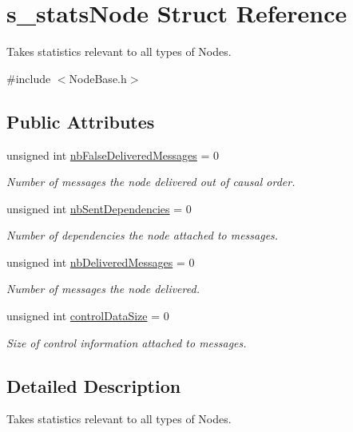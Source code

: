 \hypertarget{structs__stats_node}{}\section{s\+\_\+stats\+Node Struct Reference}
\label{structs__stats_node}


Takes statistics relevant to all types of Nodes.  




{\ttfamily \#include $<$Node\+Base.\+h$>$}

\subsection*{Public Attributes}
\begin{DoxyCompactItemize}
\item 
unsigned int \hyperlink{structs__stats_node_a009b1278ace8dbe831b9a3cdfef773e0}{nb\+False\+Delivered\+Messages} = 0
\begin{DoxyCompactList}\small\item\em Number of messages the node delivered out of causal order. \end{DoxyCompactList}\item 
unsigned int \hyperlink{structs__stats_node_af01c78389a27c9eeff8033f6b3d3beee}{nb\+Sent\+Dependencies} = 0
\begin{DoxyCompactList}\small\item\em Number of dependencies the node attached to messages. \end{DoxyCompactList}\item 
unsigned int \hyperlink{structs__stats_node_a1e33dd5d17c1008ea127e4f86a7616e1}{nb\+Delivered\+Messages} = 0
\begin{DoxyCompactList}\small\item\em Number of messages the node delivered. \end{DoxyCompactList}\item 
unsigned int \hyperlink{structs__stats_node_aaffa71bc7f01bd767080163be60fbb50}{control\+Data\+Size} = 0
\begin{DoxyCompactList}\small\item\em Size of control information attached to messages. \end{DoxyCompactList}\end{DoxyCompactItemize}


\subsection{Detailed Description}
Takes statistics relevant to all types of Nodes. 

